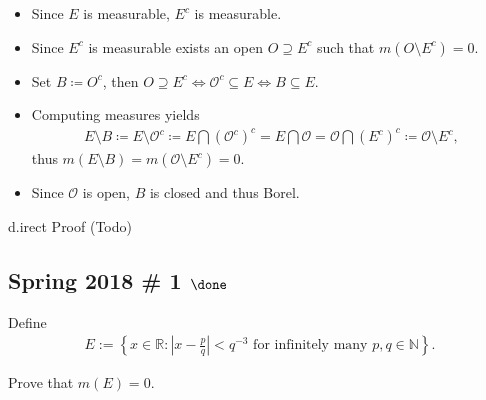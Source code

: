 \begin{solution}

\envlist

\begin{itemize}
\tightlist
\item
  Since \(E\) is measurable, \(E^c\) is measurable.
\item
  Since \(E^c\) is measurable exists an open \(O\supseteq E^c\) such
  that \(m(O\setminus E^c) = 0\).
\item
  Set \(B \coloneqq O^c\), then
  \(O\supseteq E^c \iff {\mathcal{O}}^c \subseteq E \iff B\subseteq E\).
\item
  Computing measures yields
  \begin{align*}
  E\setminus B \coloneqq E\setminus  {\mathcal{O}}^c \coloneqq E\displaystyle\bigcap({\mathcal{O}}^c)^c = E\displaystyle\bigcap{\mathcal{O}}= {\mathcal{O}}\displaystyle\bigcap(E^c)^c \coloneqq{\mathcal{O}}\setminus E^c
  ,\end{align*}
  thus \(m(E\setminus B) = m({\mathcal{O}}\setminus E^c) = 0\).
\item
  Since \({\mathcal{O}}\) is open, \(B\) is closed and thus Borel.
\end{itemize}

d.irect Proof (Todo)


\end{solution}

\hypertarget{spring-2018-1-done}{%
\subsection{\texorpdfstring{Spring 2018 \# 1
\(\done\)}{Spring 2018 \# 1 \textbackslash done}}\label{spring-2018-1-done}}

Define
\begin{align*}
E:=\left\{x \in \mathbb{R}:\left|x-\frac{p}{q}\right|<q^{-3} \text { for infinitely many } p, q \in \mathbb{N}\right\}.
\end{align*}

Prove that \(m(E) = 0\).

